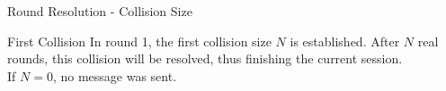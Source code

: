 \begin{frame}{Round Resolution - Collision Size}
    \begin{block}{First Collision}
        In round 1, the first collision size $N$ is established. After $N$ real rounds, this collision will be resolved, thus finishing the current session.\\
        If $N = 0$, no message was sent.\\
    \end{block}
\end{frame}
